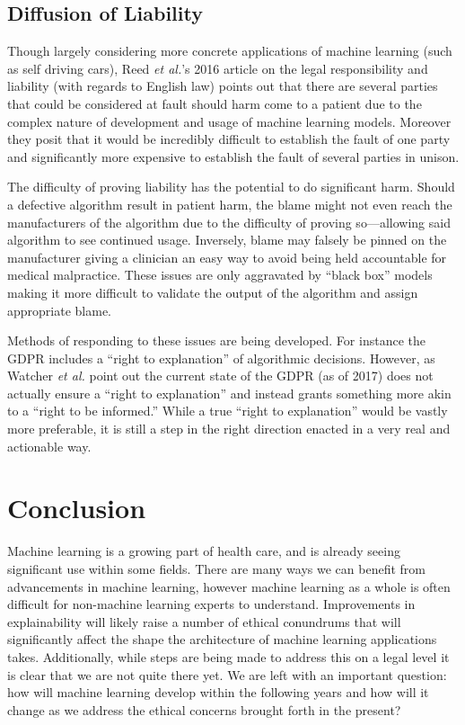 \documentclass[]{article}
\begin{document}
		\subsection{Diffusion of Liability}
			Though largely considering more concrete applications of machine learning (such as self driving cars), Reed \emph{et al.}'s 2016 article on the legal responsibility and liability (with regards to English law) points out that there are several parties that could be considered at fault should harm come to a patient due to the complex nature of development and usage of machine learning models. Moreover they posit that it would be incredibly difficult to establish the fault of one party and significantly more expensive to establish the fault of several parties in unison.\cite{reed2016responsibility}

			The difficulty of proving liability has the potential to do significant harm. Should a defective algorithm result in patient harm, the blame might not even reach the manufacturers of the algorithm due to the difficulty of proving so---allowing said algorithm to see continued usage. Inversely, blame may falsely be pinned on the manufacturer giving a clinician an easy way to avoid being held accountable for medical malpractice. These issues are only aggravated by ``black box'' models making it more difficult to validate the output of the algorithm and assign appropriate blame.

			Methods of responding to these issues are being developed. For instance the GDPR includes a ``right to explanation'' of algorithmic decisions.\cite{goodman2017european} However, as Watcher \emph{et al.} point out the current state of the GDPR (as of 2017) does not actually ensure a ``right to explanation'' and instead grants something more akin to a ``right to be informed.''\cite{wachter2017right} While a true ``right to explanation'' would be vastly more preferable, it is still a step in the right direction enacted in a very real and actionable way.
	
	\section{Conclusion}
		Machine learning is a growing part of health care, and is already seeing significant use within some fields.\cite{Shameer1156} There are many ways we can benefit from advancements in machine learning, however machine learning as a whole is often difficult for non-machine learning experts to understand.\cite{10.1145/2858036.2858529} Improvements in explainability will likely raise a number of ethical conundrums that will significantly affect the shape the architecture of machine learning applications takes. Additionally, while steps are being made to address this on a legal level\cite{goodman2017european} it is clear that we are not quite there yet.\cite{wachter2017right} We are left with an important question: how will machine learning develop within the following years and how will it change as we address the ethical concerns brought forth in the present?

			
\medskip



		
\end{document}

